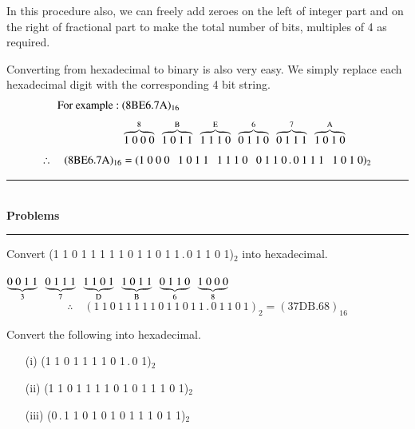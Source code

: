 In this procedure also, we can freely add zeroes on the left of integer part and on the right of fractional part to make the total number of bits, multiples of 4 as required.

\smallskip
{}

Converting from hexadecimal to binary is also very easy. We simply replace each hexadecimal digit with the corresponding 4 bit string.
\begin{align*}
\text{For example~:~} &(\text{8BE6.7A})_{16}\\[3pt]
& \overbrace{1~0~0~0}^{8} \ \ \overbrace{1~0~1~1}^{\rmB} \ \ \overbrace{1~1~1~0}^{\rmE} \ \ \overbrace{0~1~1~0}^{6} \ \ \overbrace{0~1~1~1}^{7} \ \ \overbrace{1~0~1~0}^{\rmA}\\[3pt]
\therefore\quad (\text{8BE6.7A})_{16} &= (1~0~0~0 \ \ \ 1~0~1~1 \ \ \ 1~1~1~0 \ \ \ 0~1~1~0\,.\,0~1~1~1 \ \ \ 1~0~1~0)_{2}
\end{align*}

\eject

\begin{center}
\rule{4cm}{1pt}\\
{\bf\Large Problems}\\[-3pt]
\rule{4cm}{1pt}
\end{center}

\begin{problem}\label{prob5.20}
Convert (1 1 0 1 1 1 1 1 0 1 1 0 1 1\,.\,0 1 1 0 1)$_{2}$ into hexadecimal.
\end{problem}

\begin{solution}
$\underbrace{0~0~1~1}_{3} \ \ \underbrace{0~1~1~1}_{7} \ \ \underbrace{1~1~0~1}_{\rmD} \ \ \underbrace{1~0~1~1}_{\rmB} \ \ \underbrace{0~1~1~0}_{6} \ \ \underbrace{1~0~0~0}_{8}$
$$
\therefore\quad (1~1~0~1~1~1~1~1~0~1~1~0~1~1\,.\,0~1~1~0~1)_{2}=(\text{37DB.68})_{16}
$$
\end{solution}

\begin{problem}\label{prob5.21}
Convert the following into hexadecimal.
\begin{itemize}
\item[(i)] (1 1 0 1 1 1 1 0 1\,.\,0 1)$_{2}$

\item[(ii)] (1 1 0 1 1 1 1 0 1 0 1 1 1 0 1)$_{2}$

\item[(iii)] (0\,.\,1 1 0 1 0 1 0 1 1 1 0 1 1)$_{2}$
\end{itemize}
\end{problem}


